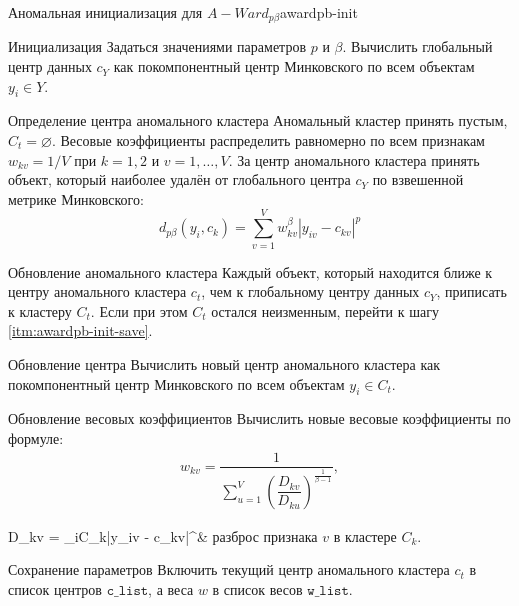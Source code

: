 \documentclass[12pt]{diploma}
\begin{document}
		\begin{algorithm}{Аномальная инициализация для $ A-Ward_{p\beta} $}{awardpb-init}
			\begin{astep}{Инициализация}
				Задаться значениями параметров $ p $ и $ \beta $. Вычислить глобальный центр данных $ c_Y $ как покомпонентный центр Минковского по всем объектам $ y_i \in Y $.
			\end{astep}
			\begin{astep}{Определение центра аномального кластера} \label{itm:awardpb-init-center}
				Аномальный кластер принять пустым, $ C_t = \varnothing $. Весовые коэффициенты распределить равномерно по всем признакам $ w_{kv} = 1/V $ при $ k=1,2 $ и $ v=1,\ldots,V $. За центр аномального кластера принять объект, который наиболее удалён от глобального центра $ c_Y $ по взвешенной метрике Минковского:
				\begin{equation} \label{eq:weighted-mink}
					d_{p\beta}(y_i, c_k) = \sum_{v=1}^{V}w^\beta_{kv}|y_{iv}-c_{kv}|^p
				\end{equation}
			\end{astep}
			\begin{astep}{Обновление аномального кластера}
				Каждый объект, который находится ближе к центру аномального кластера $ c_t $, чем к глобальному центру данных $ c_Y $, приписать к кластеру $ C_t $. Если при этом $ C_t $ остался неизменным, перейти к шагу \ref{itm:awardpb-init-save}.
			\end{astep}
			\begin{astep}{Обновление центра}
				Вычислить новый центр аномального кластера как покомпонентный центр Минковского по всем  объектам $ y_i \in C_t $.
			\end{astep}
			\begin{astep}{Обновление весовых коэффициентов}
				Вычислить новые весовые коэффициенты по формуле:
				\begin{eqnarray} \label{eq:weights}
					w_{kv}=\dfrac{1}{\sum_{u=1}^{V} \left ( \dfrac{D_{kv}}{D_{ku}} \right )^{\frac{1}{\beta-1}}},
				\end{eqnarray}	
				\begin{conditions}
					D_{kv} = \sum_{i\in C_k}{}|y_{iv} - c_{kv}|^\beta & разброс признака $ v $ в  кластере  $ C_k $. 
				\end{conditions}
			\end{astep}
			\begin{astep}{Сохранение параметров}\label{itm:awardpb-init-save}
				Включить текущий центр аномального кластера $ c_t $ в список центров $ \mathtt{c\_list} $, а веса $ w $ в список весов $ \mathtt{w\_list} $.

\end{astep}
\end{algorithm}
\end{document}

